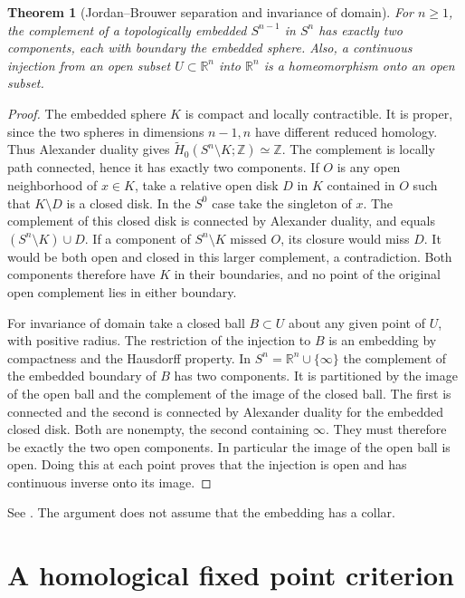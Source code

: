 \documentclass[11pt,oneside,openany]{book}
\theoremstyle{plain}
\newtheorem{theorem}{Theorem}[chapter]
\theoremstyle{definition}
\theoremstyle{remark}
\begin{document}
\begin{theorem}[Jordan--Brouwer separation and invariance of domain]
\label{thm:p202-invariance-domain}
For \(n\geq1\), the complement of a topologically embedded
\(S^{n-1}\) in \(S^n\) has exactly two components, each with
boundary the embedded sphere. Also, a continuous injection
from an open subset \(U\subset\mathbb R^n\) into
\(\mathbb R^n\) is a homeomorphism onto an open subset.
\end{theorem}
\begin{proof}
The embedded sphere \(K\) is compact and locally
contractible. It is proper, since the two spheres in
dimensions \(n-1,n\) have different reduced homology.
Thus Alexander duality gives
\(\widetilde H_0(S^n\setminus K;\mathbb Z)\simeq\mathbb Z\).
The complement is locally path connected, hence it has
exactly two components. If \(O\) is any open neighborhood
of \(x\in K\), take a relative open disk \(D\) in \(K\)
contained in \(O\) such that \(K\setminus D\) is a closed
disk. In the \(S^0\) case take the singleton of \(x\).
The complement of this closed disk is connected by
Alexander duality, and equals \((S^n\setminus K)\cup D\).
If a component of \(S^n\setminus K\) missed \(O\),
its closure would miss \(D\). It would be both open and
closed in this larger complement, a contradiction.
Both components therefore have \(K\) in their boundaries,
and no point of the original open complement lies
in either boundary.

For invariance of domain take a closed ball
\(B\subset U\) about any given point of \(U\), with
positive radius. The restriction of the injection
to \(B\) is an embedding by compactness and the
Hausdorff property. In \(S^n=\mathbb R^n\cup\{\infty\}\)
the complement of the embedded boundary of \(B\)
has two components. It is partitioned by the image
of the open ball and the complement of the image
of the closed ball. The first is connected and the
second is connected by Alexander duality for the
embedded closed disk. Both are nonempty, the second
containing \(\infty\). They must therefore be exactly
the two open components. In particular the image of
the open ball is open. Doing this at each point proves
that the injection is open and has continuous inverse
onto its image.
\end{proof}

See \cite[Section 2.B]{Hatcher}. The argument does not
assume that the embedding has a collar.

\section{A homological fixed point criterion}\label{p202:T35}
\end{document}
